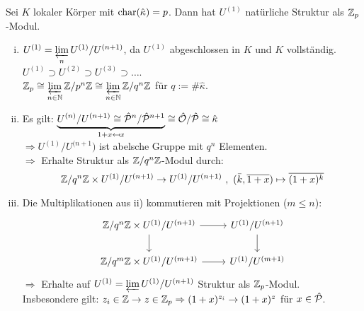 \begin{Bem}
Sei $K$ lokaler Körper mit $\operatorname{char}(\hat{\kappa})=p$. Dann hat $U^{(1)}$ natürliche Struktur als $\mathbb{Z}_p$-Modul.
\begin{enumerate}[i)]
\item $U^{(1)}=\varprojlim\limits_n U^{(1)}/U^{(n+1)}$, da $U^{(1)}$ abgeschlossen in $K$ und $K$ vollständig.\\
$U^{(1)} \supset U^{(2)} \supset U^{(3)} \supset \dots$.\\
$\mathbb{Z}_p \cong \varprojlim\limits_{n \in \mathbb{N}} \mathbb{Z}/p^n\mathbb{Z} \cong \varprojlim\limits_{n \in \mathbb{N}} \mathbb{Z}/q^n\mathbb{Z}$ für $q:=\#\hat{\kappa}$.
\item Es gilt: $\underbrace{U^{(n)}/U^{(n+1)} \cong \hat{\mathcal{P}}^n/\hat{\mathcal{P}}^{n+1}}_{1+x \mapsfrom x} \cong \hat{\mathcal{O}} / \hat{\mathcal{P}} \cong \hat{\kappa}$\\
$\Rightarrow U^{(1)}/U^{(n+1})$ ist abelsche Gruppe mit $q^n$ Elementen.\\
$\Rightarrow$ Erhalte Struktur als $\mathbb{Z}/q^n\mathbb{Z}$-Modul durch:
\[\mathbb{Z}/q^n\mathbb{Z} \times U^{(1)}/U^{(n+1)} \to U^{(1)}/U^{(n+1)} \ , \ (\bar{k}, \overline{1+x}) \mapsto \overline{(1+x)^k}\]
\item Die Multiplikationen aus ii) kommutieren mit Projektionen ($m \leq n$):
\[\begin{tikzcd}
\Z/q^n\Z \times U^{(1)}/U^{(n+1)} \arrow[r] \arrow[d] & U^{(1)}/U^{(n+1)} \arrow[d]\\
\Z/q^m\Z \times U^{(1)}/U^{(m+1)} \arrow[r] &U^{(1)}/U^{(m+1)}
\end{tikzcd}\]
$\Rightarrow$ Erhalte auf $U^{(1)}= \varprojlim\limits U^{(1)}/U^{(n+1)}$ Struktur als $\mathbb{Z}_p$-Modul.\\ Insbesondere gilt: $z_i \in \mathbb{Z} \to z \in \mathbb{Z}_p \Rightarrow (1+x)^{z_i} \to (1+x)^z$ für $x \in \hat{\mathcal{P}}$.
\end{enumerate}
\end{Bem}

